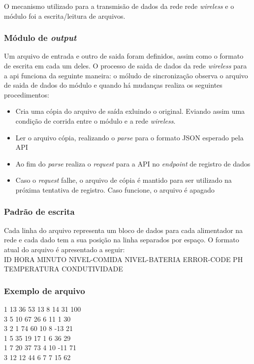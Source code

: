 O mecanismo utilizado para a transmisão de dados da rede rede \textit{wireless} e o módulo foi a escrita/leitura de arquivos.

\subsubsection{Módulo de \textit{output}}
Um arquivo de entrada e outro de saida foram definidos, assim como o formato de escrita em cada um deles. O processo de saida de dados da rede \textit{wireless} para a api funciona da seguinte maneira: o móludo de sincronização observa o arquivo de saida de dados do módulo  e quando há mudanças realiza os seguintes procedimentos:

\begin{itemize}
  \item Cria uma cópia do arquivo de saída exluindo o original. Eviando assim uma condição de corrida entre o módulo e a rede \textit{wireless}.
  \item Ler o arquivo cópia, realizando o \textit{parse} para o formato JSON esperado pela API
  \item Ao fim do \textit{parse} realiza o \textit{request} para a API no \textit{endpoint} de registro de dados
  \item Caso o \textit{request} falhe, o arquivo de cópia é mantido para ser utilizado na próxima tentativa de registro. Caso funcione, o arquivo é apagado
\end{itemize}

\subsubsection{Padrão de escrita}

Cada linha do arquivo representa um bloco de dados para cada alimentador na rede e cada dado tem a sua posição na linha separados por espaço. O formato atual do arquivo é apresentado a seguir:\\

ID HORA MINUTO NIVEL-COMIDA NIVEL-BATERIA ERROR-CODE PH TEMPERATURA CONDUTIVIDADE

\subsubsection{Exemplo de arquivo}

1 13 36 53 13 8 14 31 100\\
3 5 10 67 26 6 11 1 30\\
3 2 1 74 60 10 8 -13 21\\
1 5 35 19 17 1 6 36 29\\
1 7 20 37 73 4 10 -11 71\\
3 12 12 44 6 7 7 15 62\\

